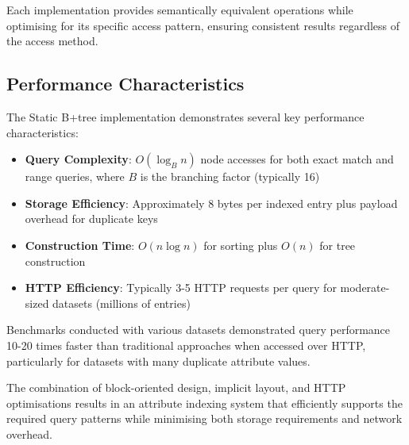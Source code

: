 Each implementation provides semantically equivalent operations while optimising for its specific access pattern, ensuring consistent results regardless of the access method.

\subsection{Performance Characteristics}
\label{subsec:performance_characteristics}

The Static B+tree implementation demonstrates several key performance characteristics:

\begin{itemize}
    \item \textbf{Query Complexity}: $O(\log_B n)$ node accesses for both exact match and range queries, where $B$ is the branching factor (typically 16)
    \item \textbf{Storage Efficiency}: Approximately 8 bytes per indexed entry plus payload overhead for duplicate keys
    \item \textbf{Construction Time}: $O(n \log n)$ for sorting plus $O(n)$ for tree construction
    \item \textbf{HTTP Efficiency}: Typically 3-5 HTTP requests per query for moderate-sized datasets (millions of entries)
\end{itemize}

Benchmarks conducted with various datasets demonstrated query performance 10-20 times faster than traditional approaches when accessed over HTTP, particularly for datasets with many duplicate attribute values.

The combination of block-oriented design, implicit layout, and HTTP optimisations results in an attribute indexing system that efficiently supports the required query patterns while minimising both storage requirements and network overhead.
